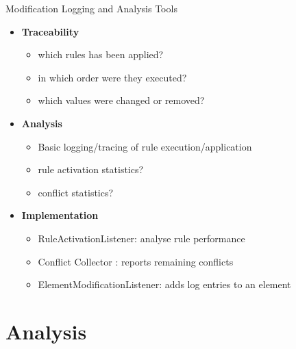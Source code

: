 \documentclass{beamer}
\begin{document}
\begin{frame}{Modification Logging and Analysis Tools}

   \begin{itemize}
   \item \textbf{Traceability}
   \begin{itemize}
	   \item which rules has been applied?
	   \item in which order were they executed?
	   \item which values were changed or removed?
   \end{itemize}

   \item \textbf{Analysis}
   \begin{itemize}
	   \item Basic logging/tracing of rule execution/application
	   \item rule activation statistics?
	   \item conflict statistics?
   \end{itemize}

   \item \textbf{Implementation}
   \begin{itemize}
   		\item RuleActivationListener: analyse rule performance
   		\item Conflict Collector : reports remaining conflicts
   		\item ElementModificationListener: adds log entries to an element
   \end{itemize}
   \end{itemize}
  
\note{

}
\end{frame}

\section{Analysis}
\end{document}
